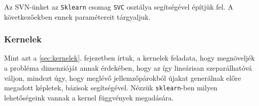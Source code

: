 Az SVN-ünket az \texttt{Sklearn} csomag \texttt{SVC} osztálya segítségével építjük fel. A következőekben ennek paramétereit tárgyaljuk.

%
%
%
%




\subsubsection{Kernelek}


Mint azt a \ref{sec:kernelek}. fejezetben írtuk, a kernelek feladata, hogy megnöveljék a probléma
dimenzióját annak érdekében, hogy az így lineárisan szeparálhatóvá váljon, mindezt 
úgy, hogy meglévő jellemzőpárokból újakat generálnak előre megadott képletek,
bázisok segítségével. Nézzük \texttt{sklearn}-ben milyen lehetőségeink vannak a 
kernel függvények megadására.

